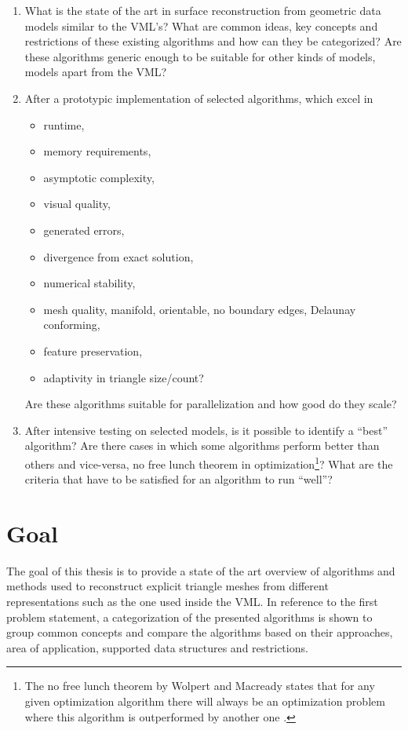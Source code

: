 \begin{enumerate}
	\item What is the state of the art in surface reconstruction from geometric data models similar to the VML's?
	What are common ideas, key concepts and restrictions of these existing algorithms and how can they be categorized?
	Are these algorithms generic enough to be suitable for other kinds of models, \ie models apart from the VML?

	\item After a prototypic implementation of selected algorithms, which excel in
	\begin{itemize}
		\item runtime,
		\item memory requirements,
		\item asymptotic complexity,
		\item visual quality,
		\item generated errors,
		\item divergence from exact solution,
		\item numerical stability,
		\item mesh quality, \eg manifold, orientable, no boundary edges, Delaunay conforming,
		\item feature preservation,
		\item adaptivity in triangle size/count?
	\end{itemize}
	Are these algorithms suitable for parallelization and how good do they scale?

	\item After intensive testing on selected models, is it possible to identify a \enquote{best} algorithm?
	Are there cases in which some algorithms perform better than others and vice-versa, \cf no free lunch theorem in optimization\footnote{The no free lunch theorem by Wolpert and Macready states that for any given optimization algorithm there will always be an optimization problem where this algorithm is outperformed by another one \cite{no_free_lunch}.}?
	What are the criteria that have to be satisfied for an algorithm to run \enquote{well}?
\end{enumerate}


\section{Goal}
\label{sec:goal}

The goal of this thesis is to provide a state of the art overview of algorithms and methods used to reconstruct explicit triangle meshes from different representations such as the one used inside the VML.
In reference to the first problem statement, a categorization of the presented algorithms is shown to group common concepts and compare the algorithms based on their approaches, area of application, supported data structures and restrictions.

